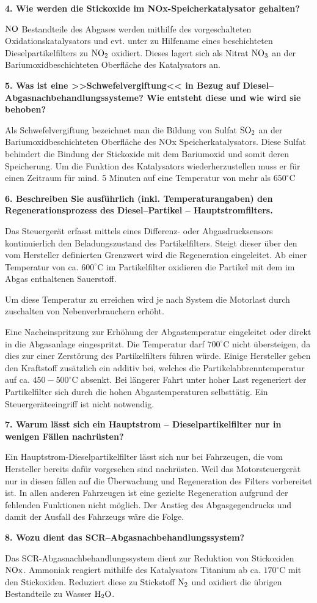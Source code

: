 \textbf{4. Wie werden die Stickoxide im NOx-Speicherkatalysator
gehalten?}

$\ce{NO}$ Bestandteile des Abgases werden mithilfe des vorgeschalteten
Oxidationskatalysators und evt. unter zu Hilfename eines beschichteten
Dieselpartikelfilters zu $\ce{NO2}$ oxidiert. Dieses lagert sich als
Nitrat $\ce{NO3}$ an der Bariumoxidbeschichteten Oberfläche des
Katalysators an.

\textbf{5. Was ist eine >>Schwefelvergiftung<< in Bezug auf
Diesel--Abgasnachbehandlungssysteme? Wie entsteht diese und wie wird sie
behoben?}

Als Schwefelvergiftung bezeichnet man die Bildung von Sulfat
$\ce{SO2}$ an der Bariumoxidbeschichteten Oberfläche des NOx
Speicherkatalysators. Diese Sulfat behindert die Bindung der Stickoxide
mit dem Bariumoxid und somit deren Speicherung. Um die Funktion des
Katalysators wiederherzustellen muss er für einen Zeitraum für mind. 5
Minuten auf eine Temperatur von mehr als $650^\circ\text{C}$

\textbf{6. Beschreiben Sie ausführlich (inkl. Temperaturangaben) den
Regenerationsprozess des Diesel--Partikel -- Hauptstromfilters.}

Das Steuergerät erfasst mittels eines Differenz- oder Abgasdrucksensors
kontinuierlich den Beladungszustand des Partikelfilters. Steigt dieser
über den vom Hersteller definierten Grenzwert wird die Regeneration
eingeleitet. Ab einer Temperatur von ca. $600^\circ\text{C}$ im
Partikelfilter oxidieren die Partikel mit dem im Abgas enthaltenen
Sauerstoff.

Um diese Temperatur zu erreichen wird je nach System die Motorlast durch
zuschalten von Nebenverbrauchern erhöht.

Eine Nacheinspritzung zur Erhöhung der Abgastemperatur eingeleitet oder
direkt in die Abgasanlage eingespritzt. Die Temperatur darf
$700^\circ\text{C}$ nicht übersteigen, da dies zur einer Zerstörung
des Partikelfilters führen würde. Einige Hersteller geben den Kraftstoff
zusätzlich ein additiv bei, welches die Partikelabbrenntemperatur auf
ca. $450 - 500^\circ\text{C}$ absenkt. Bei längerer Fahrt unter hoher
Last regeneriert der Partikelfilter sich durch die hohen
Abgastemperaturen selbsttätig. Ein Steuergeräteeingriff ist nicht
notwendig.

\textbf{7. Warum lässt sich ein Hauptstrom -- Dieselpartikelfilter nur
in wenigen Fällen nachrüsten?}

Ein Hauptstrom-Dieselpartikelfilter lässt sich nur bei Fahrzeugen, die
vom Hersteller bereits dafür vorgesehen sind nachrüsten. Weil das
Motorsteuergerät nur in diesen fällen auf die Überwachung und
Regeneration des Filters vorbereitet ist. In allen anderen Fahrzeugen
ist eine gezielte Regeneration aufgrund der fehlenden Funktionen nicht
möglich. Der Anstieg des Abgasgegendrucks und damit der Ausfall des
Fahrzeugs wäre die Folge.

\textbf{8. Wozu dient das SCR--Abgasnachbehandlungssystem?}

Das SCR-Abgasnachbehandlungssystem dient zur Reduktion von Stickoxiden
$\ce{NOx}$. Ammoniak reagiert mithilfe des Katalysators Titanium ab
ca. $170^\circ\text{C}$ mit den Stickoxiden. Reduziert diese zu
Stickstoff $\ce{N2}$ und oxidiert die übrigen Bestandteile zu Wasser
$\ce{H2O}$.
